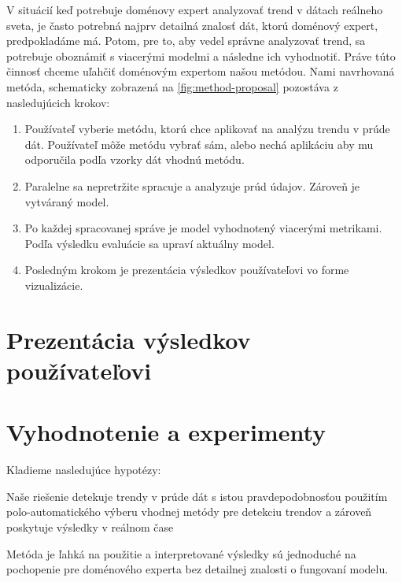 V situácií keď potrebuje doménovy expert analyzovať trend v dátach reálneho sveta, je často potrebná najprv detailná znalosť dát, ktorú doménový expert, predpokladáme má. Potom, pre to, aby vedel správne analyzovať trend, sa potrebuje oboznámiť s viacerými modelmi a následne ich vyhodnotiť. Práve túto činnosť chceme uľahčiť doménovým expertom našou metódou. Nami navrhovaná metóda, schematicky zobrazená na \ref{fig:method-proposal} pozostáva z nasledujúcich krokov:
\begin{enumerate}
	\item Používateľ vyberie metódu, ktorú chce aplikovať na analýzu trendu v prúde dát. Používateľ môže metódu vybrať sám, alebo nechá aplikáciu aby mu odporučila podľa vzorky dát vhodnú metódu.
	\item Paralelne sa nepretržite spracuje a analyzuje prúd údajov. Zároveň je vytváraný model.
	\item Po každej spracovanej správe je model vyhodnotený viacerými metrikami. Podľa výsledku evaluácie sa upraví aktuálny model.
	\item Posledným krokom je prezentácia výsledkov používateľovi vo forme vizualizácie.
\end{enumerate}
\label{fig:method-proposal}

\section{Prezentácia výsledkov používateľovi}



\section{Vyhodnotenie a experimenty}
Kladieme nasledujúce hypotézy:
\begin{hypothesis}{Naše riešenie detekuje trendy v prúde dát s istou pravdepodobnosťou použitím polo-automatického výberu vhodnej metódy pre detekciu trendov a zároveň poskytuje výsledky v reálnom čase}
\end{hypothesis}
\begin{hypothesis}{Metóda je ľahká na použitie a interpretované výsledky sú jednoduché na pochopenie pre doménového experta bez detailnej znalosti o fungovaní modelu.}
\end{hypothesis}





